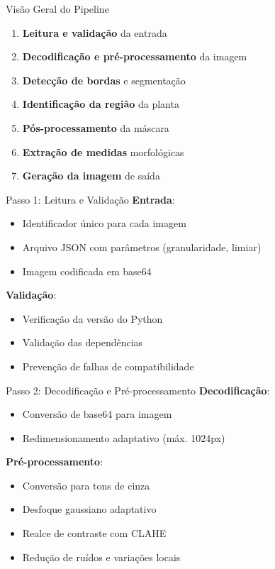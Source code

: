 \documentclass[landscape, 12pt]{beamer}
\begin{document}
\begin{frame}{Visão Geral do Pipeline}
    \begin{enumerate}
        \item \textbf{Leitura e validação} da entrada
        \item \textbf{Decodificação e pré-processamento} da imagem
        \item \textbf{Detecção de bordas} e segmentação
        \item \textbf{Identificação da região} da planta
        \item \textbf{Pós-processamento} da máscara
        \item \textbf{Extração de medidas} morfológicas
        \item \textbf{Geração da imagem} de saída
    \end{enumerate}
\end{frame}

\begin{frame}{Passo 1: Leitura e Validação}
    \textbf{Entrada}: 
    \begin{itemize}
        \item Identificador único para cada imagem
        \item Arquivo JSON com parâmetros (granularidade, limiar)
        \item Imagem codificada em base64
    \end{itemize}
    
    \vspace{0.5cm}
    \textbf{Validação}:
    \begin{itemize}
        \item Verificação da versão do Python
        \item Validação das dependências
        \item Prevenção de falhas de compatibilidade
    \end{itemize}
\end{frame}

\begin{frame}{Passo 2: Decodificação e Pré-processamento}
    \textbf{Decodificação}:
    \begin{itemize}
        \item Conversão de base64 para imagem
        \item Redimensionamento adaptativo (máx. 1024px)
    \end{itemize}
    
    \vspace{0.5cm}
    \textbf{Pré-processamento}:
    \begin{itemize}
        \item Conversão para tons de cinza
        \item Desfoque gaussiano adaptativo
        \item Realce de contraste com CLAHE
        \item Redução de ruídos e variações locais
    \end{itemize}
\end{frame}
\end{document}
